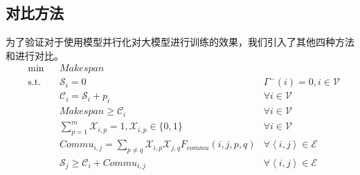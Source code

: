 \subsection{对比方法}
为了验证\sys{}对于使用模型并行化对大模型进行训练的效果，我们引入了其他四种方法和\sys{}进行对比。
\begin{align}
	& \text{min} & & \mathit{Makespan} \label{eq:p-target-2} & \\
	& \text{s.t.} & & \mathcal{S}_{i}=0 &\Gamma^{-}(i)=0, i\in \mathcal{V} \nonumber\\
	& & & \mathcal{C}_{i} = \mathcal{S}_{i} + \mathit{p}_i & \forall i\in \mathcal{V} \nonumber\\
	& & & \mathit{Makespan} \ge \mathcal{C}_{i} & \forall i\in \mathcal{V}\nonumber\\
	& & & \sum_{p=1}^{m} \mathcal{X}_{i,p}=1, \mathcal{X}_{i,p}\in\{0,1\} & \forall i\in \mathcal{V} \nonumber\\
	& & & \mathit{Commu}_{i,j} = \sum_{p\neq q}\mathcal{X}_{i,p}\mathcal{X}_{j,q}F_{\mathit{commu}}(i,j,p,q) & \forall \left\langle i,j\right\rangle \in \mathcal{E} \nonumber\\
	& & & \mathcal{S}_{j} \ge \mathcal{C}_{i} + \mathit{Commu}_{i,j}&\forall \left\langle i,j\right\rangle \in \mathcal{E} \nonumber
\end{align}

